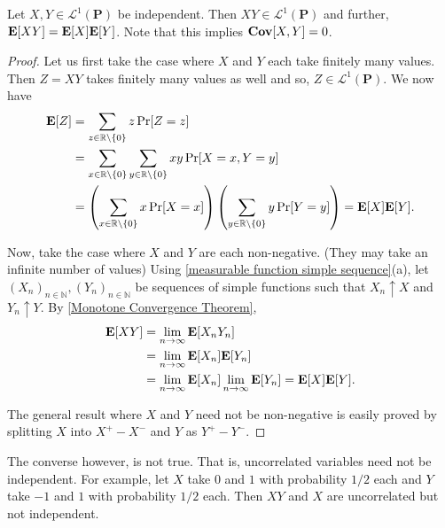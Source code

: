 \begin{theorem}
\label{independent uncorrelated}
    Let $X,Y\in\mathcal{L}^1(\textbf{P})$ be independent. Then $XY\in\mathcal{L}^1(\textbf{P})$ and further, $\textbf{E}[XY]=\textbf{E}[X]\textbf{E}[Y]$. Note that this implies $\operatorname{\textbf{Cov}}[X,Y]=0$.
\end{theorem}
\begin{proof}
    Let us first take the case where $X$ and $Y$ each take finitely many values. Then $Z=XY$ takes finitely many values as well and so, $Z\in\mathcal{L}^1(\textbf{P})$. We now have
    \begin{align*}
        \textbf{E}[Z] &= \sum_{z\in\mathbb{R}\setminus\{0\}} z\Pr[Z=z] \\
        &= \sum_{x\in\mathbb{R}\setminus\{0\}}\sum_{y\in\mathbb{R}\setminus\{0\}} xy\Pr[X=x, Y=y] \\
        &= \left(\sum_{x\in\mathbb{R}\setminus\{0\}}x\Pr[X=x]\right)\left(\sum_{y\in\mathbb{R}\setminus\{0\}}y\Pr[Y=y]\right) = \textbf{E}[X]\textbf{E}[Y].
    \end{align*}
    
    Now, take the case where $X$ and $Y$ are each non-negative. (They may take an infinite number of values)
    Using \cref{measurable function simple sequence}(a), let $(X_n)_{n\in\mathbb{N}},(Y_n)_{n\in\mathbb{N}}$ be sequences of simple functions such that $X_n\uparrow X$ and $Y_n\uparrow Y$. By \cref{Monotone Convergence Theorem},
    \begin{align*}
        \textbf{E}[XY] &= \lim_{n\to\infty}\textbf{E}[X_nY_n] \\
        &= \lim_{n\to\infty} \textbf{E}[X_n]\textbf{E}[Y_n] \\
        &= \lim_{n\to\infty} \textbf{E}[X_n] \lim_{n\to\infty} \textbf{E}[Y_n] = \textbf{E}[X]\textbf{E}[Y].
    \end{align*}
    
    The general result where $X$ and $Y$ need not be non-negative is easily proved by splitting $X$ into $X^+-X^-$ and $Y$ as $Y^+-Y^-$.
\end{proof}

The converse however, is not true. That is, uncorrelated variables need not be independent. For example, let $X$ take $0$ and $1$ with probability $1/2$ each and $Y$ take $-1$ and $1$ with probability $1/2$ each. Then $XY$ and $X$ are uncorrelated but not independent.

